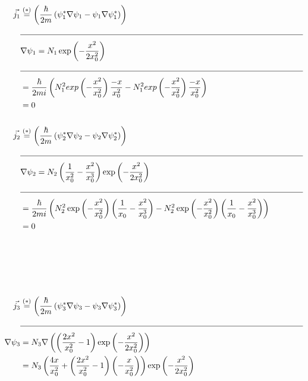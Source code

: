     \begin{align*}
        \vec{j_1} &\stackrel{(*)}{=} \left( \frac{\hbar}{2m} \left( \psi_1^* \nabla \psi_1 - \psi_1 \nabla \psi_1^* \right) \right)\\
        &\text{\noindent\makebox[\linewidth]{\rule{\linewidth}{0.4pt}}}\\
        &\nabla \psi_1 = N_1 \exp \left(-\frac{x^2}{2x_0^2} \right)\\
        &\text{\noindent\makebox[\linewidth]{\rule{\linewidth}{0.4pt}}}\\
        &= \frac{\hbar}{2mi} \left( N_1^2 exp \left( -\frac{x^2}{x_0^2} \right) \frac{-x}{x_0^2} - N_1^2 exp\left( -\frac{x^2}{x_0^2} \right) \frac{-x}{x_0^2} \right)\\
        &= 0\\
        \\
        \vec{j_2} &\stackrel{(*)}{=} \left( \frac{\hbar}{2m} \left( \psi_2^* \nabla \psi_2 - \psi_2 \nabla \psi_2^* \right) \right)\\
        &\text{\noindent\makebox[\linewidth]{\rule{\linewidth}{0.4pt}}}\\
        &\nabla \psi_2 = N_2 \left( \frac{1}{x_0^2} - \frac{x^2}{x_0^3} \right) \exp \left( - \frac{x^2}{2x_0^2} \right)\\
        &\text{\noindent\makebox[\linewidth]{\rule{\linewidth}{0.4pt}}}\\
        &= \frac{\hbar}{2mi} \left( N_2^2 \exp \left( -\frac{x^2}{x_0^2} \right) \left( \frac{1}{x_0} - \frac{x^2}{x_0^3} \right) - N_2^2 \exp \left( -\frac{x^2}{x_0^2} \right) \left( \frac{1}{x_0} - \frac{x^2}{x_0^3} \right)  \right)\\
        &= 0\\
        \\
        \\
        \\
        \\
        \\
        \vec{j_3} &\stackrel{(*)}{=} \left( \frac{\hbar}{2m} \left( \psi_3^* \nabla \psi_3 - \psi_3 \nabla \psi_3^* \right) \right)\\
        &\text{\noindent\makebox[\linewidth]{\rule{\linewidth}{0.4pt}}}\\
        \nabla \psi_3 &= N_3 \nabla \left( \left( \frac{2x^2}{x_0^2} -1 \right) \exp \left( -\frac{x^2}{2x_0^2} \right) \right)\\
        &= N_3 \left( \frac{4x}{x_0^2} + \left( \frac{2x^2}{x_0^2} - 1 \right) \left( -\frac{x}{x_0^2} \right) \right) \exp \left( -\frac{x^2}{2x_0^2} \right)\\

\end{align*}
